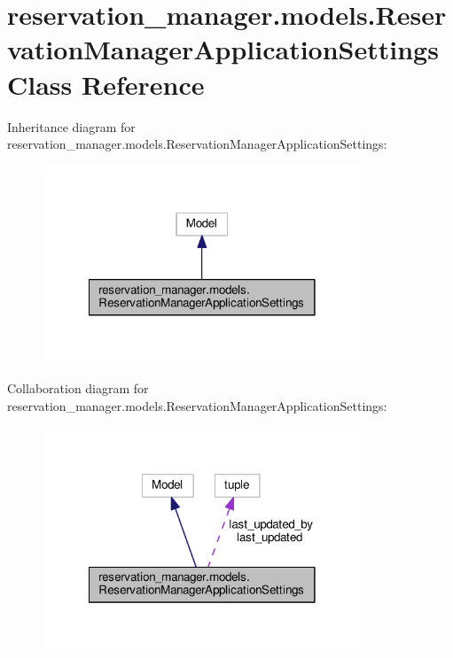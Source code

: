 \hypertarget{classreservation__manager_1_1models_1_1ReservationManagerApplicationSettings}{\section{reservation\-\_\-manager.\-models.\-Reservation\-Manager\-Application\-Settings Class Reference}
\label{classreservation__manager_1_1models_1_1ReservationManagerApplicationSettings}
}


Inheritance diagram for reservation\-\_\-manager.\-models.\-Reservation\-Manager\-Application\-Settings\-:
\nopagebreak
\begin{figure}[H]
\begin{center}
\leavevmode
\includegraphics[width=270pt]{classreservation__manager_1_1models_1_1ReservationManagerApplicationSettings__inherit__graph}
\end{center}
\end{figure}


Collaboration diagram for reservation\-\_\-manager.\-models.\-Reservation\-Manager\-Application\-Settings\-:
\nopagebreak
\begin{figure}[H]
\begin{center}
\leavevmode
\includegraphics[width=270pt]{classreservation__manager_1_1models_1_1ReservationManagerApplicationSettings__coll__graph}
\end{center}
\end{figure}

